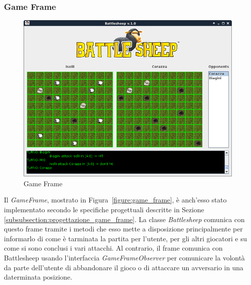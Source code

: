 \subsubsection{Game Frame}
\begin{figure}[!h]
	\centering
	\includegraphics[scale=0.5]{core/imgs/gui/game_frame}
	\caption{Game Frame}
	\label{figuregame_frame}
\end{figure}
Il \textit{GameFrame}, mostrato in Figura~\ref{figure:game_frame}, è anch'esso
stato implementato secondo le specifiche progettuali descritte in Sezione
\ref{subsubsection:progettazione_game_frame}.\newline
La classe \textit{Battlesheep} comunica con questo frame tramite i metodi che
esso mette a disposizione principalmente per informarlo di come è tarminata la
partita per l'utente, per gli altri giocatori e su come si sono conclusi i vari
attacchi. Al contrario, il frame comunica con Battlesheep usando l'interfaccia
\textit{GameFrameObserver} per comunicare la volontà da parte dell'utente di
abbandonare il gioco o di attaccare un avversario in una daterminata posizione.
